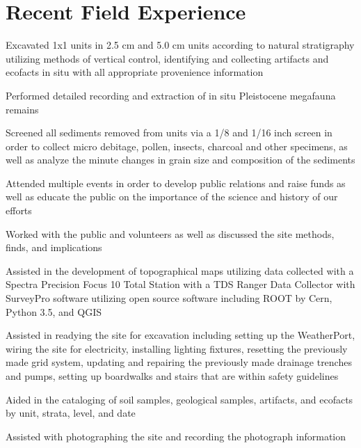 \documentclass[letterpaper]{resume}
\begin{document}
\section{Recent Field Experience}

\begin{compactitem}
\item Excavated 1x1 units in 2.5 cm and 5.0 cm units according to natural stratigraphy utilizing methods of vertical control, identifying and collecting artifacts and ecofacts in situ with all appropriate provenience information
\item Performed detailed recording and extraction of in situ Pleistocene megafauna remains
\item Screened all sediments removed from units via a 1/8 and 1/16 inch screen in order to collect micro debitage, pollen, insects, charcoal and other specimens, as well as analyze the minute changes in grain size and composition of the sediments
\item Attended multiple events in order to develop public relations and raise funds as well as educate the public on the importance of the science and history of our efforts
\item Worked with the public and volunteers as well as discussed the site methods, finds, and implications
\item Assisted in the development of topographical maps utilizing data collected with a Spectra Precision Focus 10 Total Station with a TDS Ranger Data Collector with SurveyPro software utilizing open source software including ROOT by Cern, Python 3.5, and QGIS
\item Assisted in readying the site for excavation including setting up the WeatherPort, wiring the site for electricity, installing lighting fixtures, resetting the previously made grid system, updating and repairing the previously made drainage trenches and pumps, setting up boardwalks and stairs that are within safety guidelines
\item Aided in the cataloging of soil samples, geological samples, artifacts, and ecofacts  by unit, strata, level, and date
\item Assisted with photographing the site and recording the photograph information
\end{compactitem}
\end{document}
